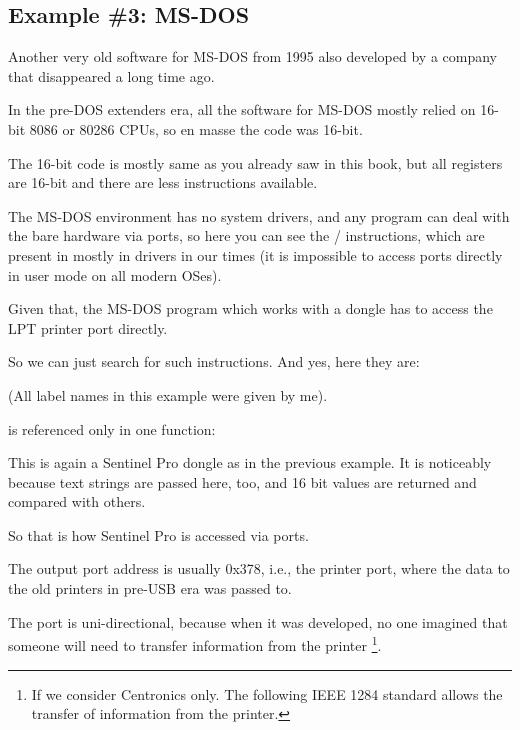 \subsection{Example \#3: MS-DOS}
\label{dongle_16bit_dos}

Another very old software for MS-DOS from 1995 
also developed by a company that disappeared a long time ago.


In the pre-DOS extenders era, all the software for MS-DOS mostly relied on 16-bit 8086 or 80286 CPUs,
so en masse the code was 16-bit.

The 16-bit code is mostly same as you already saw in this book, but all registers
are 16-bit and there are less instructions available.

\label{IN_example}
\label{OUT_example}

The MS-DOS environment has no system drivers, and any program can deal with the bare hardware via ports,
so here you can see the / instructions, which are present in mostly in drivers in our times
(it is impossible to access ports directly in \gls{user mode} on all modern \ac{OS}es).

Given that, the MS-DOS program which works with a dongle has to access the LPT printer port directly.

So we can just search for such instructions. And yes, here they are:



(All label names in this example were given by me).

 is referenced only in one function:



This is again a Sentinel Pro  dongle as in the previous example.
It is noticeably because text strings are passed here, too, and 16 bit values are returned and compared with others.

So that is how Sentinel Pro is accessed via ports.

The output port address is usually 0x378, i.e.,
the printer port, where the data to the old printers in pre-USB era was passed to.

The port is uni-directional, because when it was developed, no one imagined that someone
will need to transfer information from the printer
\footnote{If we consider Centronics only. The following IEEE 1284 standard allows the transfer of information from
the printer.}.

